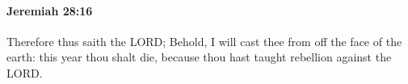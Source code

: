 
		\paragraph{Jeremiah 28:16} %
			\label{JEREMIAH-28-16}

			Therefore thus saith the LORD; Behold, I will cast thee from off the face of the earth: this year thou shalt die, because thou hast taught rebellion against the LORD.


